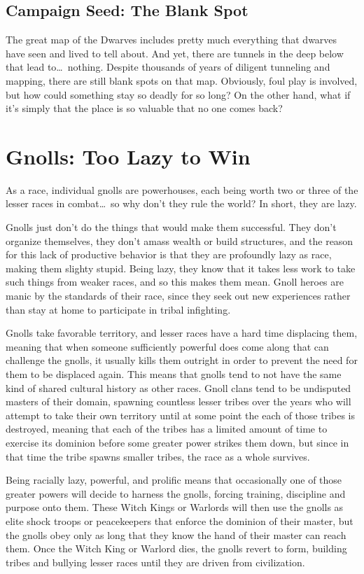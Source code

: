 \subsection{Campaign Seed: The Blank Spot}
The great map of the Dwarves includes pretty much everything that dwarves have seen and lived to tell about. And yet, there are tunnels in the deep below that lead to\ldots\  nothing. Despite thousands of years of diligent tunneling and mapping, there are still blank spots on that map. Obviously, foul play is involved, but how could something stay so deadly for so long? On the other hand, what if it's simply that the place is so valuable that no one comes back?

\section{Gnolls: Too Lazy to Win}
As a race, individual gnolls are powerhouses, each being worth two or three of the lesser races in combat\ldots\ so why don't they rule the world? In short, they are lazy.

Gnolls just don't do the things that would make them successful. They don't organize themselves, they don't amass wealth or build structures, and the reason for this lack of productive behavior is that they are profoundly lazy as race, making them slighty stupid. Being lazy, they know that it takes less work to take such things from weaker races, and so this makes them mean. Gnoll heroes are manic by the standards of their race, since they seek out new experiences rather than stay at home to participate in tribal infighting.

Gnolls take favorable territory, and lesser races have a hard time displacing them, meaning that when someone sufficiently powerful does come along that can challenge the gnolls, it usually kills them outright in order to prevent the need for them to be displaced again. This means that gnolls tend to not have the same kind of shared cultural history as other races. Gnoll clans tend to be undisputed masters of their domain, spawning countless lesser tribes over the years who will attempt to take their own territory until at some point the each of those tribes is destroyed, meaning that each of the tribes has a limited amount of time to exercise its dominion before some greater power strikes them down, but since in that time the tribe spawns smaller tribes, the race as a whole survives.

Being racially lazy, powerful, and prolific means that occasionally one of those greater powers will decide to harness the gnolls, forcing training, discipline and purpose onto them. These Witch Kings or Warlords will then use the gnolls as elite shock troops or peacekeepers that enforce the dominion of their master, but the gnolls obey only as long that they know the hand of their master can reach them. Once the Witch King or Warlord dies, the gnolls revert to form, building tribes and bullying lesser races until they are driven from civilization.

